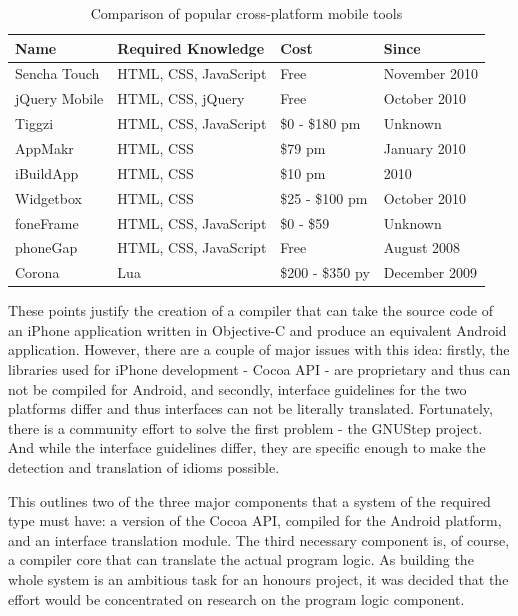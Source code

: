 \documentclass[parskip]{cs4rep}
\begin{document}
\begin{table}
    \centering
    \begin{tabular}{ | l | p{4.4cm} | p{2.6cm} | p{3cm} |}
    \hline
    Name & Required Knowledge & Cost & Since \\ \hline
    Sencha Touch & HTML, CSS, JavaScript & Free & November 2010 \\ \hline
    jQuery Mobile & HTML, CSS, jQuery & Free & October 2010 \\ \hline
    Tiggzi & HTML, CSS, JavaScript & \$0 - \$180 pm & Unknown \\ \hline
    AppMakr & HTML, CSS & \$79 pm & January 2010 \\ \hline
    iBuildApp & HTML, CSS & \$10 pm & 2010 \\ \hline
    Widgetbox & HTML, CSS & \$25 - \$100 pm & October 2010 \\ \hline
    foneFrame & HTML, CSS, JavaScript & \$0 - \$59 & Unknown \\ \hline
    phoneGap & HTML, CSS, JavaScript & Free & August 2008 \\ \hline
    Corona & Lua & \$200 - \$350 py & December 2009 \\ \hline
    \end{tabular}
    \caption{Comparison of popular cross-platform mobile tools \cite{P4}}
    \label{tab:crossPlatformTools}
\end{table}

These points justify the creation of a compiler that can take the source code of
an iPhone application written in Objective-C and produce an equivalent Android
application. However, there are a couple of major issues with this idea:
firstly, the libraries used for iPhone development - Cocoa API - are proprietary
and thus can not be compiled for Android, and secondly, interface guidelines for
the two platforms differ and thus interfaces can not be literally translated.
Fortunately, there is a community effort to solve the first problem - the
GNUStep project. And while the interface guidelines differ, they are
specific enough to make the detection and translation of idioms possible.

This outlines two of the three major components that a system of the required type must have: a version of the Cocoa API, compiled for the Android platform, and an interface translation module. The third necessary component is, of course, a compiler core that can translate the actual program logic. As building the whole system is an ambitious task for an honours project, it was decided that the effort would be concentrated on research on the program logic component.
\end{document}
